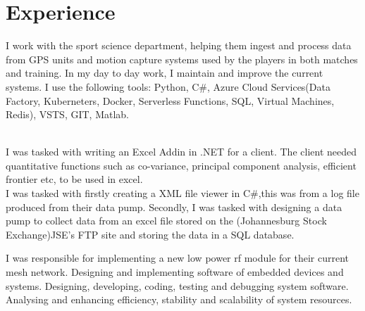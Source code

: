 \documentclass[]{deedy-resume-openfont}
\begin{document}
\begin{minipage}[t]{0.66\textwidth} 


\section{Experience}

I work with the sport science department, helping them ingest and process data from GPS units and motion capture systems used by the players in both matches and training. In my day to day work, I maintain and improve the current systems. I use the following tools: Python, C\#, Azure Cloud Services(Data Factory, Kuberneters, Docker, Serverless Functions, SQL, Virtual Machines, Redis), VSTS, GIT, Matlab.
\sectionsep

\\
I was tasked with writing an Excel Addin in .NET for a client. The client needed quantitative functions such as co-variance, principal component analysis, efficient frontier etc, to be used in excel.
\sectionsep
\\
I was tasked with firstly creating a XML file viewer in C\#,this was from a log file produced from their data pump. Secondly, I was tasked with designing a data pump to collect data from an excel file stored on the (Johannesburg Stock Exchange)JSE’s FTP site and storing the data in a SQL database.
\sectionsep

I was responsible for implementing a new low power rf module for their current mesh network. Designing and implementing software of embedded devices and systems. Designing, developing, coding, testing and debugging system software. Analysing and enhancing efficiency, stability and scalability of system resources.
\sectionsep


\end{minipage}
\end{document}
